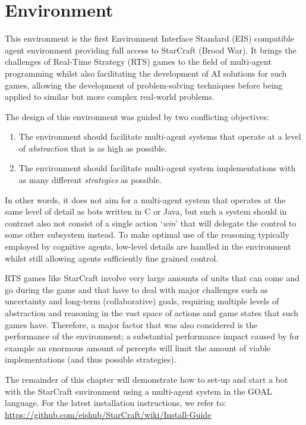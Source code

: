 \chapter{Environment}
This environment is the first Environment Interface Standard (EIS) compatible agent environment providing full access to StarCraft (Brood War). It brings the challenges of Real-Time Strategy (RTS) games to the field of multi-agent programming whilst also facilitating the development of AI solutions for such games, allowing the development of problem-solving techniques before being applied to similar but more complex real-world problems.

The design of this environment was guided by two conflicting objectives:
\begin{enumerate}
 \item The environment should facilitate multi-agent systems that operate at a level of \textit{abstraction} that is as high as possible.
 \item The environment should facilitate multi-agent system implementations with as many different \textit{strategies} as possible.
\end{enumerate}
In other words, it does not aim for a multi-agent system that operates at the same level of detail as bots written in C or Java, but such a system should in contrast also not consist of a single action `\textit{win}' that will delegate the control to some other subsystem instead. To make optimal use of the reasoning typically employed by cognitive agents, low-level details are handled in the environment whilst still allowing agents sufficiently fine grained control.

RTS games like StarCraft involve very large amounts of units that can come and go during the game and that have to deal with major challenges such as uncertainty and long-term (collaborative) goals, requiring multiple levels of abstraction and reasoning in the vast space of actions and game states that such games have. Therefore, a major factor that was also considered is the performance of the environment; a substantial performance impact caused by for example an enormous amount of percepts will limit the amount of viable implementations (and thus possible strategies).

The remainder of this chapter will demonstrate how to set-up and start a bot with the StarCraft environment using a multi-agent system in the GOAL language. For the latest installation instructions, we refer to: \\ \url{https://github.com/eishub/StarCraft/wiki/Install-Guide}

